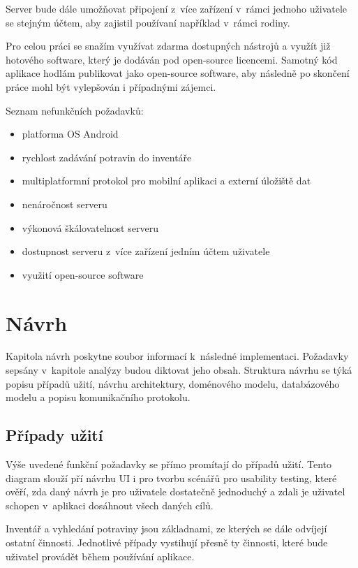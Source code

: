 \documentclass[thesis=B,czech]{FITthesis}[2013/10/20]
\begin{document}
Server bude dále umožňovat připojení z~více zařízení v~rámci jednoho uživatele se stejným účtem, aby zajistil používaní například v~rámci rodiny. 

Pro celou práci se snažím využívat zdarma dostupných nástrojů a využít již hotového software, který je dodáván pod open-source licencemi. Samotný kód aplikace hodlám publikovat jako open-source software, aby následně po skončení práce mohl být vylepšován i případnými zájemci.

Seznam nefunkčních požadavků:

\begin{itemize}
  \item platforma OS Android
  \item rychlost zadávání potravin do inventáře
  \item multiplatformní protokol pro mobilní aplikaci a externí úložiště dat
  \item nenáročnost serveru
  \item výkonová škálovatelnost serveru
  \item dostupnost serveru z~více zařízení jedním účtem uživatele
  \item využití open-source software
\end{itemize}


\chapter{Návrh}

Kapitola návrh poskytne soubor informací k~následné implementaci. Požadavky sepsány v~kapitole analýzy budou diktovat jeho obsah. Struktura návrhu se týká popisu případů užití, návrhu architektury, doménového modelu, databázového modelu a popisu komunikačního protokolu.

\section{Případy užití}

Výše uvedené funkční požadavky se přímo promítají do případů užití. Tento diagram slouží pří návrhu UI i pro tvorbu scénářů pro usability testing, které ověří, zda daný návrh je pro uživatele dostatečně jednoduchý a zdali je uživatel schopen v~aplikaci dosáhnout všech daných cílů.

Inventář a vyhledání potraviny jsou základnami, ze kterých se dále odvíjejí ostatní činnosti. Jednotlivé případy vystihují přesně ty činnosti, které bude uživatel provádět během používání aplikace.
\end{document}
